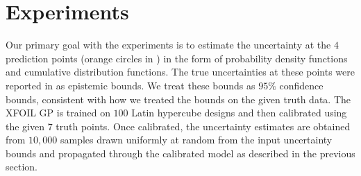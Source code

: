 \documentclass[a4paper,12pt]{article}
\begin{document}
\section{Experiments}
\label{sec:experiments}
Our primary goal with the experiments is to estimate the uncertainty at the $4$ prediction points (orange circles in ) in the form of probability density functions and cumulative distribution functions. The true uncertainties at these points were reported in \citep[Figs. 2--5]{cary2026summary} as epistemic bounds. We treat these bounds as $95\%$ confidence bounds, consistent with how we treated the bounds on the given truth data. The XFOIL GP is trained on $100$ Latin hypercube designs and then calibrated using the given $7$ truth points. Once calibrated, the uncertainty estimates are obtained from $10,000$ samples drawn uniformly at random from the input uncertainty bounds and propagated through the calibrated model as described in the previous section.
\end{document}

